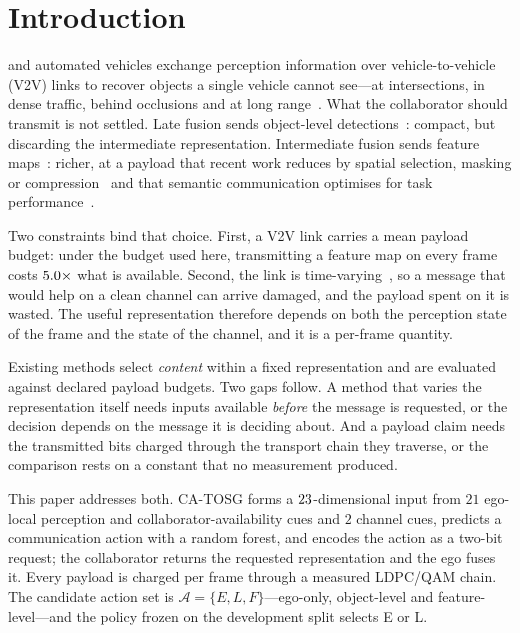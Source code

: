\documentclass[journal]{IEEEtran}
\newcommand{\method}{CA-TOSG}
\begin{document}
\section{Introduction}
 and automated vehicles exchange perception information over
vehicle-to-vehicle (V2V) links to recover objects a single vehicle cannot see---at intersections, in
dense traffic, behind occlusions and at long range~\cite{xu2022opv2v,xu2022v2xvit}. What the
collaborator should transmit is not settled. Late fusion sends object-level
detections~\cite{xu2022opv2v}: compact, but discarding the intermediate representation. Intermediate
fusion sends feature maps~\cite{xu2022v2xvit,hu2022where2comm}: richer, at a payload that recent work
reduces by spatial selection, masking or compression~\cite{hu2022where2comm} and that semantic
communication optimises for task performance~\cite{sheng2024importance,gan2026scomcp}.

Two constraints bind that choice. First, a V2V link carries a mean payload budget: under the budget
used here, transmitting a feature map on every frame costs $5.0\times$ what is
available. Second, the link is time-varying~\cite{ieee80211bd,3gpp37885}, so a message that would
help on a clean channel can arrive damaged, and the payload spent on it is wasted. The useful
representation therefore depends on both the perception state of the frame and the state of the
channel, and it is a per-frame quantity.

Existing methods select \emph{content} within a fixed representation and are evaluated against
declared payload budgets. Two gaps follow. A method that varies the representation itself needs
inputs available \emph{before} the message is requested, or the decision depends on the message it
is deciding about. And a payload claim needs the transmitted bits charged through the transport
chain they traverse, or the comparison rests on a constant that no measurement produced.

This paper addresses both. \method{} forms a $23$-dimensional input from $21$ ego-local
perception and collaborator-availability cues and $2$ channel cues, predicts a communication action
with a random forest, and encodes the action as a two-bit request; the collaborator returns the
requested representation and the ego fuses it. Every payload is charged per frame through a measured
LDPC/QAM chain. The candidate action set is $\mathcal{A} = \{E, L, F\}$---ego-only, object-level and
feature-level---and the policy frozen on the development split selects E or L.
\end{document}
